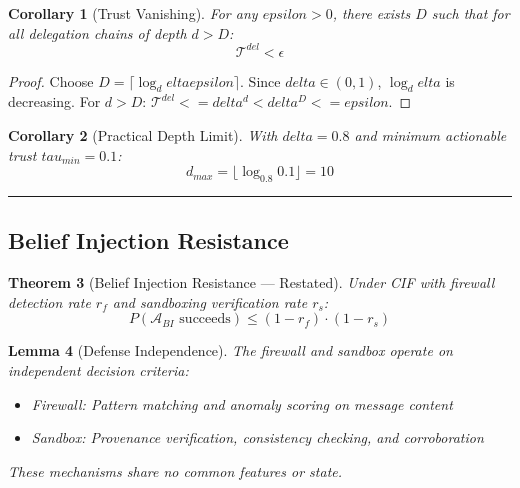 \documentclass[
]{article}
\newtheorem{theorem}{Theorem}[section]
\newtheorem{lemma}[theorem]{Lemma}
\newtheorem{corollary}[theorem]{Corollary}
\begin{document}
\begin{corollary}[Trust Vanishing]
\label{cor:trust-vanishing}
For any $epsilon > 0$, there exists $D$ such that for all delegation chains of depth $d > D$:
\begin{equation}
\label{eq:trust-vanishing}
\mathcal{T}^{del} < \epsilon
\end{equation}
\end{corollary}

\begin{proof}
Choose $D = \lceil \log_delta epsilon \rceil$. Since $delta \in (0,1)$, $\log_delta$ is decreasing. For $d > D$: $\mathcal{T}^{del} <= delta^d < delta^D <= epsilon$.
\end{proof}

\begin{corollary}[Practical Depth Limit]
\label{cor:practical-depth}
With $delta = 0.8$ and minimum actionable trust $tau_{min} = 0.1$:
\begin{equation}
\label{eq:practical-depth}
d_{max} = \lfloor \log_{0.8} 0.1 \rfloor = 10
\end{equation}
\end{corollary}

\begin{center}\rule{0.5\linewidth}{0.5pt}\end{center}

\subsection{Belief Injection Resistance}\label{sec:thm57-proof}

\begin{theorem}[Belief Injection Resistance --- Restated]
\label{thm:belief-injection-restated}
Under CIF with firewall detection rate $r_f$ and sandboxing verification rate $r_s$:
\begin{equation}
\label{eq:belief-injection-restated}
P(\mathcal{A}_{BI} \text{ succeeds}) \leq (1 - r_f) \cdot (1 - r_s)
\end{equation}
\end{theorem}

\begin{lemma}[Defense Independence]
\label{lem:defense-independence}
The firewall and sandbox operate on independent decision criteria:
\begin{itemize}
\item Firewall: Pattern matching and anomaly scoring on message content
\item Sandbox: Provenance verification, consistency checking, and corroboration
\end{itemize}
These mechanisms share no common features or state.
\end{lemma}
\end{document}
